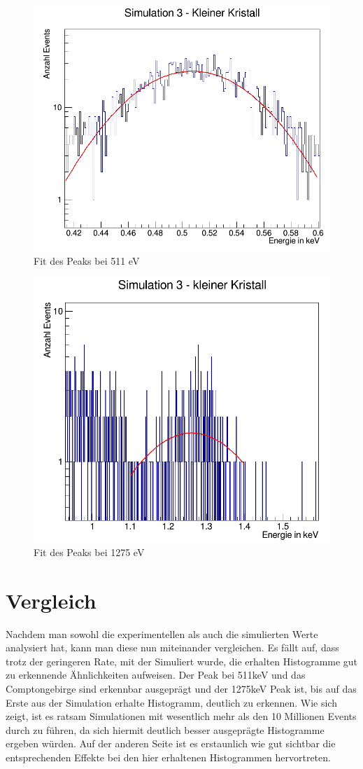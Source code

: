 \documentclass[a4paper,14pt,twoside]{article}
\begin{document}
			\begin{figure}[H]
				\begin{center}
				\includegraphics[width=0.7\linewidth]{Simulation3(KB)_511_fit}
				\caption{Fit des Peaks bei 511 eV}
				\label{S3_511_fit}
				\end{center}
			\end{figure}
			
			\begin{figure}[H]
				\begin{center}
				\includegraphics[width=0.7\linewidth]{Simulation3(KB)_1275_fit}
				\caption{Fit des Peaks bei 1275 eV}
				\label{S3_1275_fit}
				\end{center}
			\end{figure}
			
			
\section{Vergleich}
Nachdem man sowohl die experimentellen als auch die simulierten Werte analysiert hat, kann man diese nun miteinander vergleichen.
Es fällt auf, dass trotz der geringeren Rate, mit der Simuliert wurde, die erhalten Histogramme gut zu erkennende Ähnlichkeiten aufweisen. Der Peak bei 511keV und das Comptongebirge sind erkennbar ausgeprägt und der 1275keV Peak ist, bis auf das Erste aus der Simulation erhalte Histogramm, deutlich zu erkennen. Wie sich zeigt, ist es ratsam Simulationen mit wesentlich mehr als den 10 Millionen Events durch zu führen, da sich hiermit deutlich besser ausgeprägte Histogramme ergeben würden. Auf der anderen Seite ist es erstaunlich wie gut sichtbar die entsprechenden Effekte bei den hier erhaltenen Histogrammen hervortreten. 
\end{document}

